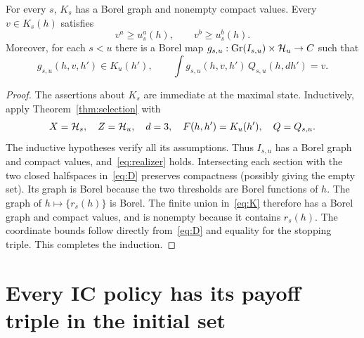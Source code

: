 \documentclass[11pt]{extarticle}
\begin{document}
\begin{lemma}\label{lem:compact}
For every $s$, $K_s$ has a Borel graph and nonempty compact values.
Every $v\in K_s(h)$ satisfies
\begin{equation}
    v^a\geq u_s^a(h),\qquad v^b\geq u_s^b(h).
    \label{eq:coordinate-bounds}
\end{equation}
Moreover, for each $s<u$ there is a Borel map
$g_{s,u}:\operatorname{Gr}(I_{s,u})\times\mathcal{H}_u\to C$ such that
\begin{equation}
    g_{s,u}(h,v,h')\in K_u(h'),\qquad
    \int g_{s,u}(h,v,h')\,Q_{s,u}(h,dh')=v.
    \label{eq:realizer}
\end{equation}
\end{lemma}
\begin{proof}
The assertions about $K_s$ are immediate at the maximal state. Inductively,
apply Theorem~\ref{thm:selection} with
\[
    X=\mathcal{H}_s,\quad Z=\mathcal{H}_u,\quad d=3,\quad
    F(h,h')=K_u(h'),\quad Q=Q_{s,u}.
\]
The inductive hypotheses verify all its assumptions. Thus $I_{s,u}$ has
a Borel graph and compact values, and~\eqref{eq:realizer} holds.
Intersecting each section with the two closed halfspaces
in~\eqref{eq:D} preserves compactness (possibly giving the empty set).
Its graph is Borel because the two thresholds are Borel functions of
$h$. The graph of $h\mapsto\{r_s(h)\}$ is Borel. The finite union
in~\eqref{eq:K} therefore has a Borel graph and compact values, and is
nonempty because it contains $r_s(h)$.
The coordinate bounds follow directly from~\eqref{eq:D} and equality
for the stopping triple. This completes the induction.
\end{proof}

\section{Every IC policy has its payoff triple in the initial set}
\end{document}
